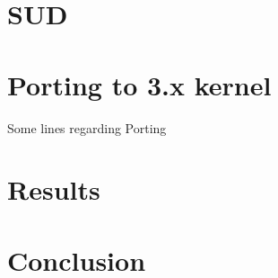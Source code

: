 \documentclass[12pt,titlepage,a4paper]{article}
\begin{document}
\section{SUD}

\section{Porting to 3.x kernel}
Some lines regarding Porting 
\section{Results}

\section{Conclusion}
\end{document}
